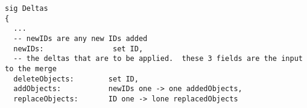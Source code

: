 \lstset{frame=tb, aboveskip=12pt, belowskip=-3pt, breaklines=true, basicstyle=\small\ttfamily, tabsize=2, mathescape=true}
\begin{lstlisting}[caption={deltas.als, lines 5-35}, label=alloy:delta-instructions, captionpos=b]
sig Deltas
{
  ...
  -- newIDs are any new IDs added
  newIDs:                set ID,  
  -- the deltas that are to be applied.  these 3 fields are the input to the merge
  deleteObjects:        set ID,
  addObjects:           newIDs one -> one addedObjects,
  replaceObjects:       ID one -> lone replacedObjects
\end{lstlisting}